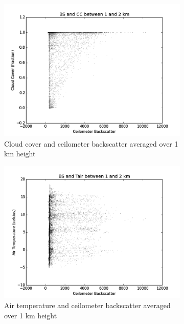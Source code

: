 \documentclass[a4paper,titlepage, twoside]{report}
\begin{document}
\begin{figure}
\centering
\begin{subfigure}{0.48\textwidth}
\includegraphics[width=\textwidth]{BS1_CC.png}
\caption{Cloud cover and ceilometer backscatter averaged over 1 km height}
\end{subfigure}
\hfill
\begin{subfigure}{0.48\textwidth}
\includegraphics[width=\textwidth]{BS1_Tair.png}
\caption{Air temperature and ceilometer backscatter averaged over 1 km height}
\end{subfigure}
\\
\begin{subfigure}{0.48\textwidth}

\end{subfigure}
\end{figure}
\end{document}
